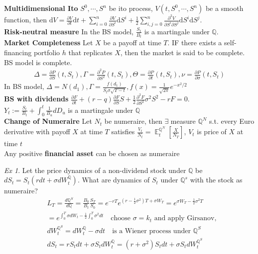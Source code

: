 \documentclass[10pt,landscape, a4paper]{article}
\theoremstyle{remark}
\newtheorem*{Ex}{Ex}
\newcommand{\E}{\operatorname{\mathbb{E}}}
\newcommand{\Q}{\mathbb{Q}}
\begin{document}
\begin{multicols*}{3}
\textbf{Multidimensional Ito} $S^0, \cdots, S^n$ be ito process, $V(t, S^0, \cdots, S^n)$ be a smooth function, then $\text{d}V = \frac{\partial V}{\partial t}\text{d}t + \sum_{i=0}^{n} \frac{\partial V}{\partial S^i}\text{d}S^i + \frac{1}{2} \sum_{i,j=0}^{n} \frac{\partial^2 V}{\partial S^i \partial S^j}\text{d}S^i\text{d}S^j.
$\\

\textbf{Risk-neutral measure} In the BS model, $\frac{S_t}{B_t}$ is a martingale under $\Q$.\\

\textbf{Market Completeness} Let $X$ be a payoff at time $T$. IF there exists a self-financing portfolio $h$ that replicates $X$, then the market is said to be complete. BS model is complete.
\begin{align*}
    \Delta = \frac{\partial P}{\partial S} (t, S_t), \Gamma = \frac{\partial^2 P}{\partial S^2} (t, S_t), \Theta = \frac{\partial P}{\partial t} (t, S_t), \nu = \frac{\partial P}{\partial \sigma} (t, S_t)
\end{align*}
In BS model, $\Delta = N(d_1), \Gamma = \frac{f(d_1)}{S_t \sigma \sqrt{T-t}}, f(x) = \frac{1}{\sqrt{2\pi}} e^{-x^2 / 2}$\\

\textbf{BS with dividends} $\frac{\partial F}{\partial t} + (r - q)\frac{\partial F}{\partial S}S + \frac{1}{2} \frac{\partial^2 F}{\partial S^2} \sigma^2 S^2 - rF = 0.
$\\
$Y_t:= \frac{S_t}{B_t} + \int^t_0 \frac{1}{B_u} dD_u$ is a martingale under $\Q$\\

\textbf{Change of Numeraire} Let $N_t$ be numeraire, then $\exists$ measure $\mathbb{Q}^N$ s.t. every Euro derivative with payoff $X$ at time $T$ satisfies $\frac{V_t}{N_t} = \E^{\mathbb{Q}^N}_t \left[ \frac{X}{N_T} \right]$, $V_t$ is price of $X$ at time $t$\\
Any positive \textbf{financial asset} can be chosen as numeraire
\begin{Ex}
    Let the price dynamics of a non-dividend stock under $\Q$ be $dS_t = S_t (r dt + \sigma dW^{\Q}_t)$. What are dynamics of $S_t$ under $\Q^s$ with the stock as numeraire?\\
    \begin{align*}
        &L_T = \frac{d \Q^S}{d\Q} = \frac{B_0}{B_t} \frac{S_T}{S_0} = e^{-rT} e^{(r-\frac{1}{2}\sigma^2)T + \sigma W_T}= e^{\sigma W_T - \frac{1}{2}\sigma^2 T} \\
        &= e^{\int^T_0 \sigma dW_t - \frac{1}{2} \int^T_0 \sigma^2 dt} \quad \text{choose $\sigma = k_t$ and apply Girsanov},\\
        &d W^{\Q^S}_t = dW^{\Q}_t - \sigma dt \quad \text{is a Wiener process under $\Q^S$}\\
        &dS_t = rS_t dt + \sigma S_t d W^{\Q}_t = (r+\sigma^2) S_t dt + \sigma S_t d W^{\Q^S}_t
    \end{align*}
\end{Ex}


\end{multicols*}
\end{document}
